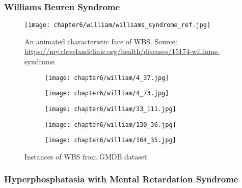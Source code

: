 \documentclass[../report.tex]{subfiles}
\begin{document}
	\subsubsection{Williams Beuren Syndrome}
	\begin{figure}[H]\label{fig_williams_char}
	\centering
	\texttt{[image: chapter6/william/williams\_syndrome\_ref.jpg]}	
	\caption[An animated characteristic face of WBS]{An animated characteristic face of WBS. Source: \url{https://my.clevelandclinic.org/health/diseases/15174-williams-syndrome}}
	\end{figure}
	
	\begin{figure}[H]\label{fig_williams}
		\centering
		\begin{subfigure}[b]{0.17\textwidth}
			\centering
			\texttt{[image: chapter6/william/4\_37.jpg]}
		\end{subfigure}
		\begin{subfigure}[b]{0.17\textwidth}
			\centering
			\texttt{[image: chapter6/william/4\_73.jpg]}
		\end{subfigure}	
			\begin{subfigure}[b]{0.17\textwidth}
			\centering
			\texttt{[image: chapter6/william/33\_111.jpg]}
		\end{subfigure}	
			\begin{subfigure}[b]{0.17\textwidth}
			\centering
			\texttt{[image: chapter6/william/130\_36.jpg]}
		\end{subfigure}	
			\begin{subfigure}[b]{0.17\textwidth}
			\centering
			\texttt{[image: chapter6/william/164\_35.jpg]}
		\end{subfigure}	
	\caption[Instances of WBS from GMDB dataset]{Instances of WBS from GMDB dataset }
	\end{figure}





	\subsubsection{Hyperphosphatasia with Mental Retardation Syndrome}
	 
\end{document}
